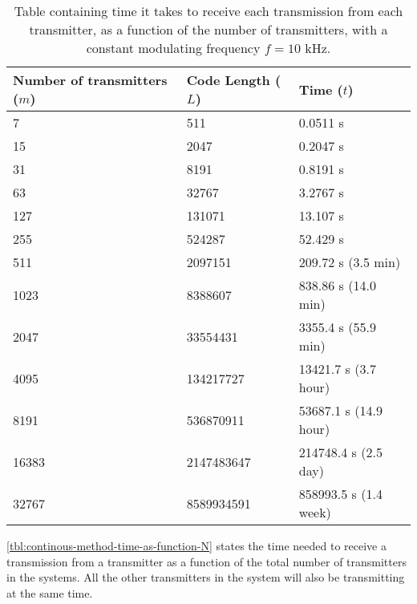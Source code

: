 \begin{table}[t]
	\centering
	\begin{tabular}{  | l | l | l | }

	\hline
	Number of transmitters ($m$)	& Code Length ($L$)		& Time ($t$)					\\ \hline


	7							& 511					& 0.0511 s					\\ \hline 
	15							& 2047					& 0.2047 s					\\ \hline
	31							& 8191					& 0.8191 s					\\ \hline
	63							& 32767					& 3.2767 s					\\ \hline
	127							& 131071				& 13.107 s					\\ \hline
	255							& 524287				& 52.429 s					\\ \hline
	511							& 2097151				& 209.72 s (3.5 min)		\\ \hline
	1023						& 8388607				& 838.86 s (14.0 min)		\\ \hline
	2047						& 33554431				& 3355.4 s (55.9 min)		\\ \hline
	4095						& 134217727				& 13421.7 s (3.7 hour)		\\ \hline
	8191						& 536870911				& 53687.1 s (14.9 hour)		\\ \hline
	16383						& 2147483647			& 214748.4 s (2.5 day)		\\ \hline
	32767						& 8589934591			& 858993.5 s (1.4 week)		\\ \hline



\end{tabular}
	\caption{Table containing time it takes to receive each transmission from each transmitter, as a function of the number of transmitters, with a constant modulating frequency $f = 10$ kHz.}
	\label{tbl:continous-method-time-as-function-N}
\end{table}

\autoref{tbl:continous-method-time-as-function-N} states the time needed to receive a transmission from a transmitter as a function of the total number of transmitters in the systems. 
All the other transmitters in the system will also be transmitting at the same time.





